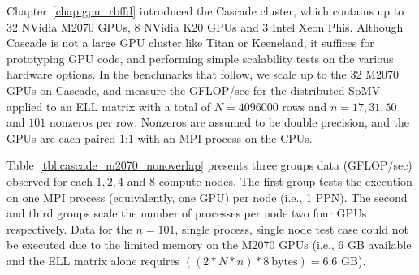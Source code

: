 
Chapter~\ref{chap:gpu_rbffd} introduced the Cascade cluster, which contains up to 32 NVidia M2070 GPUs, 8 NVidia K20 GPUs and 3 Intel Xeon Phis. Although Cascade is not a large GPU cluster like Titan or Keeneland, it suffices for prototyping GPU code, and performing simple scalability tests on the various hardware options. In the benchmarks that follow, we scale up to the 32 M2070 GPUs on Cascade, and measure the GFLOP/sec for the distributed SpMV applied to an ELL matrix with a total of $N=4096000$ rows and $n=17, 31, 50$ and $101$ nonzeros per row. Nonzeros are assumed to be double precision, and the GPUs are each paired 1:1 with an MPI process on the CPUs. 

Table~\ref{tbl:cascade_m2070_nonoverlap} presents three groups data (GFLOP/sec) observed for each $1, 2, 4$ and $8$ compute nodes. The first group tests the execution on one MPI process (equivalently, one GPU) per node (i.e., 1 PPN). The second and third groups scale the number of processes per node two four GPUs respectively. Data for the $n=101$, single process, single node test case could not be executed due to the limited memory on the M2070 GPUs (i.e., 6 GB available and the ELL matrix alone requires $((2*N*n)*8\ \text{bytes}) = 6.6$ GB).

